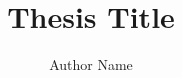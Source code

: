 \documentclass[12pt]{report}          %
\title{Thesis Title} %
\author{Author Name}
\begin{document}
\preamblepagenumbering %
\titlepage %



\doublespacing









\singlespacing %
               
\tableofcontents
\listoftables  %
\listoffigures %
               
               
\doublespacing

\setforbodyoftext %

\end{document}
